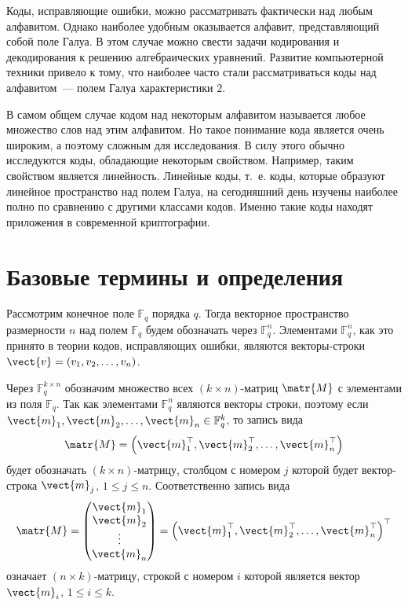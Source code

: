 \documentclass{cmcmsuthesis-phd}
\begin{document}
Коды, исправляющие ошибки, можно рассматривать фактически над любым алфавитом.
Однако наиболее удобным оказывается алфавит, представляющий собой поле Галуа.
В этом случае можно свести задачи кодирования и декодирования к решению алгебраических уравнений.
Развитие компьютерной техники привело к тому, что наиболее часто стали рассматриваться коды над алфавитом~--- полем Галуа характеристики \(2\).

В самом общем случае кодом над некоторым алфавитом называется любое множество слов над этим алфавитом.
Но такое понимание кода является очень широким, а поэтому сложным для исследования.
В силу этого обычно исследуются коды, обладающие некоторым свойством.
Например, таким свойством является линейность.
Линейные коды, т.~е. коды, которые образуют линейное пространство над полем Галуа, на сегодняшний день изучены наиболее полно по сравнению с другими классами кодов.
Именно такие коды находят приложения в современной криптографии.
\section{Базовые термины и определения}
\label{sec:org3d5df15}
Рассмотрим конечное поле \(\mathbb{F}_q\) порядка \(q\).
Тогда векторное пространство размерности \(n\) над полем \(\mathbb{F}_q\) будем обозначать через \(\mathbb{F}^n_q\).
Элементами \(\mathbb{F}^{n}_{q}\), как это принято в теории кодов, исправляющих ошибки, являются векторы-строки \(\vect{v} = \left(v_{1}, v_{2}, \dotsc, v_{n}\right)\).

Через \(\mathbb{F}^{k \times n}_{q}\) обозначим множество всех \((k \times n)\)-матриц \(\matr{M}\) с элементами из поля \(\mathbb{F}_{q}\).
Так как элементами \(\mathbb{F}^{n}_{q}\) являются векторы строки, поэтому если \(\vect{m}_1, \vect{m}_2, \dotsc ,\vect{m}_{n}\in \mathbb{F}^{k}_{q}\), то запись вида
\[ \matr{M}=\left(\vect{m}^{\top}_{1}, \vect{m}^{\top}_{2}, \dotsc, \vect{m}^{\top}_{n}\right) \]
будет обозначать \((k \times n)\)-матрицу, столбцом с номером \(j\) которой будет вектор-строка \(\vect{m}_j\), \(1\le j\le n\).
Соответственно запись вида
\[ \matr{M}= \begin{pmatrix}
             \vect{m}_{1}\\
             \vect{m}_{2}\\
             \vdots\\
             \vect{m}_{n}
             \end{pmatrix} = \left(\vect{m}^{\top}_{1}, \vect{m}^{\top}_{2}, \dotsc, \vect{m}^{\top}_{n}\right)^{\top} \]
означает \((n \times k)\)-матрицу, строкой с номером \(i\) которой является вектор \(\vect{m}_i\), \(1\le i\le k\).
\end{document}

